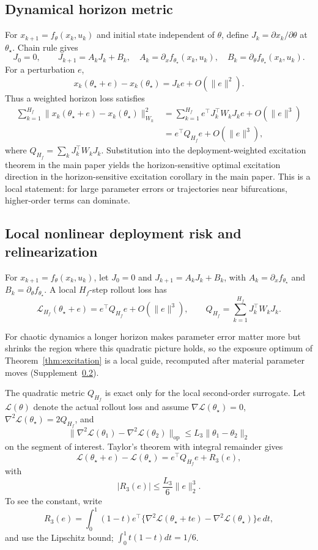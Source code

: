\subsection{Dynamical horizon metric}\label{app:horizon-metric}
For $x_{k+1}=f_\theta(x_k,u_k)$ and initial state independent of $\theta$, define $J_k=\partial x_k/\partial\theta$ at $\theta_\star$. Chain rule gives
\[
J_0=0,\qquad J_{k+1}=A_kJ_k+B_k,
\quad A_k=\partial_xf_{\theta_\star}(x_k,u_k),\quad B_k=\partial_\theta f_{\theta_\star}(x_k,u_k).
\]
For a perturbation $e$,
\[
x_k(\theta_\star+e)-x_k(\theta_\star)=J_ke+O(\|e\|^2).
\]
Thus a weighted horizon loss satisfies
\[
\begin{aligned}
\sum_{k=1}^{H_f}\|x_k(\theta_\star+e)-x_k(\theta_\star)\|_{W_k}^2
&=\sum_{k=1}^{H_f}e^\top J_k^\top W_kJ_ke+O(\|e\|^3)\\
&=e^\top Q_{H_f}e+O(\|e\|^3),
\end{aligned}
\]
where $Q_{H_f}=\sum_kJ_k^\top W_kJ_k$. Substitution into the deployment-weighted excitation theorem in the main paper yields the horizon-sensitive optimal excitation direction in the horizon-sensitive excitation corollary in the main paper. This is a local statement: for large parameter errors or trajectories near bifurcations, higher-order terms can dominate.


\subsection{Local nonlinear deployment risk and relinearization}\label{app:nonlinear-risk}
\begin{corollary}\label{cor:horizon_geometry}
For $x_{k+1}=f_\theta(x_k,u_k)$, let $J_0=0$ and $J_{k+1}=A_kJ_k+B_k$, with $A_k=\partial_x f_{\theta_\star}$ and $B_k=\partial_\theta f_{\theta_\star}$. A local $H_f$-step rollout loss has
\begin{equation}\label{eq:horizon-Q}
\mathcal L_{H_f}(\theta_\star+e)=e^\top Q_{H_f}e+O(\|e\|^3),\qquad Q_{H_f}=\sum_{k=1}^{H_f}J_k^\top W_kJ_k.
\end{equation}
\end{corollary}
\Intuition For chaotic dynamics a longer horizon makes parameter error matter more but shrinks the region where this quadratic picture holds, so the exposure optimum of Theorem~\ref{thm:excitation} is a local guide, recomputed after material parameter moves (Supplement~\ref{app:nonlinear-risk}).

The quadratic metric $Q_{H_f}$ is exact only for the local second-order surrogate. Let $\mathcal L(\theta)$ denote the actual rollout loss and assume $\nabla \mathcal L(\theta_\star)=0$, $\nabla^2\mathcal L(\theta_\star)=2Q_{H_f}$, and
\[
\|\nabla^2\mathcal L(\theta_1)-\nabla^2\mathcal L(\theta_2)\|_{\mathrm{op}}
\le L_3\|\theta_1-\theta_2\|_2
\]
on the segment of interest. Taylor's theorem with integral remainder gives
\[
\mathcal L(\theta_\star+e)-\mathcal L(\theta_\star)
=e^\top Q_{H_f}e+R_3(e),
\]
with
\[
|R_3(e)|\le \frac{L_3}{6}\|e\|_2^3.
\]
To see the constant, write
\[
R_3(e)=\int_0^1(1-t)e^\top\{\nabla^2\mathcal L(\theta_\star+te)-\nabla^2\mathcal L(\theta_\star)\}e\,dt,
\]
and use the Lipschitz bound; $\int_0^1 t(1-t)dt=1/6$.

